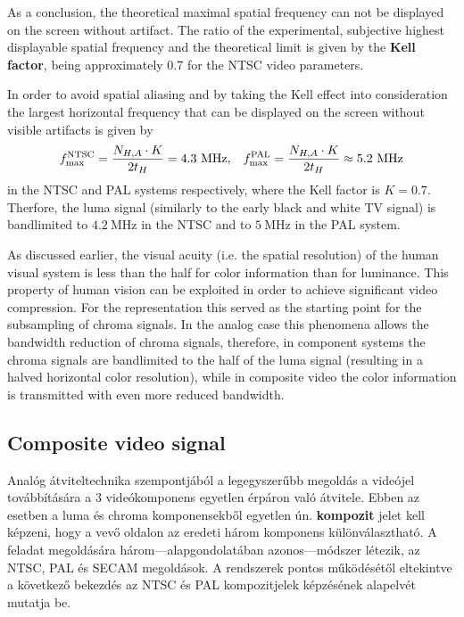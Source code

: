As a conclusion, the theoretical maximal spatial frequency can not be displayed on the screen without artifact.
The ratio of the experimental, subjective highest displayable spatial frequency and the theoretical limit is given by the \textbf{Kell factor}, being approximately 0.7 for the NTSC video parameters.

In order to avoid spatial aliasing and by taking the Kell effect into consideration the largest horizontal frequency that can be displayed on the screen without visible artifacts is given by
\begin{equation}
f^{\mathrm{NTSC}}_{\mathrm{max}} = \frac{N_{H,A} \cdot K}{2 t_H} = 4.3~\mathrm{MHz},
\hspace{3mm}
f^{\mathrm{PAL}}_{\mathrm{max}} = \frac{N_{H,A} \cdot K}{2 t_H} \approx 5.2 ~\mathrm{MHz}
\end{equation}
in the NTSC and PAL systems respectively, where the Kell factor is $K = 0.7$.
Therfore, the luma signal (similarly to the early black and white TV signal) is bandlimited to $4.2~\mathrm{MHz}$ in the NTSC and to $5~\mathrm{MHz}$ in the PAL system.

\vspace{3mm}
As discussed earlier, the visual acuity (i.e. the spatial resolution) of the human visual system is less than the half for color information than for luminance.
This property of human vision can be exploited in order to achieve significant video compression.
For the \ycbcr representation this served as the starting point for the subsampling of chroma signals.
In the analog case this phenomena allows the bandwidth reduction of chroma signals, therefore, in component systems the chroma signals are bandlimited to the half of the luma signal (resulting in a halved horizontal color resolution), while in composite video the color information is transmitted with even more reduced bandwidth.

\subsection{Composite video signal}

Analóg átviteltechnika szempontjából a legegyszerűbb megoldás a videójel továbbítására a 3 videókomponens egyetlen érpáron való átvitele.
Ebben az esetben a luma és chroma komponensekből egyetlen ún. \textbf{kompozit} jelet kell képzeni, hogy a vevő oldalon az eredeti három komponens különválasztható.
A feladat megoldására három---alapgondolatában azonos---módszer létezik, az NTSC, PAL és SECAM megoldások.
A rendszerek pontos működésétől eltekintve a következő bekezdés az NTSC és PAL kompozitjelek képzésének alapelvét mutatja be.

